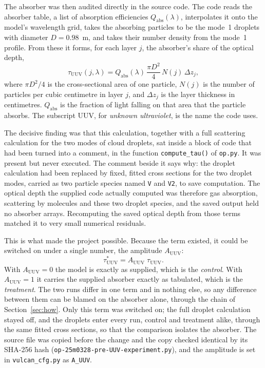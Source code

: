 The absorber was then audited directly in the source code. The code reads the absorber
table, a list of absorption efficiencies $Q_{\mathrm{abs}}(\lambda)$, interpolates it onto
the model's wavelength grid, takes the absorbing particles to be the mode~1 droplets with
diameter $D = 0.98$~\textmu m, and takes their number density from the mode~1 profile.
From these it forms, for each layer $j$, the absorber's share of the optical depth,
\begin{equation}
  \tau_{\mathrm{UUV}}(j,\lambda)
    = Q_{\mathrm{abs}}(\lambda)\,\frac{\pi D^{2}}{4}\,N(j)\,\Delta z_j ,
  \label{eq:tauuuv}
\end{equation}
where $\pi D^{2}/4$ is the cross-sectional area of one particle, $N(j)$ is the number of
particles per cubic centimetre in layer $j$, and $\Delta z_j$ is the layer thickness in
centimetres. $Q_{\mathrm{abs}}$ is the fraction of light falling on that area that the
particle absorbs. The subscript UUV, for \emph{unknown ultraviolet}, is the name the code
uses.

The decisive finding was that this calculation, together with a full scattering
calculation for the two modes of cloud droplets, sat inside a block of code that had been
turned into a comment, in the function \texttt{compute\_tau()} of \texttt{op.py}. It was
present but never executed. The comment beside it says why: the droplet calculation had
been replaced by fixed, fitted cross sections for the two droplet modes, carried as two
particle species named \texttt{V} and \texttt{V2}, to save computation. The optical depth
the supplied code actually computed was therefore gas absorption, scattering by
molecules and these two droplet species, and the saved output held no absorber arrays.
Recomputing the saved optical depth from those terms matched it to very small numerical
residuals.

This is what made the project possible. Because the term existed, it could be switched on
under a single number, the amplitude $A_{\mathrm{UUV}}$:
\begin{equation}
  \tau^{*}_{\mathrm{UUV}} = A_{\mathrm{UUV}}\;\tau_{\mathrm{UUV}} .
  \label{eq:amp}
\end{equation}
With $A_{\mathrm{UUV}} = 0$ the model is exactly as supplied, which is the
\emph{control}. With $A_{\mathrm{UUV}} = 1$ it carries the supplied absorber exactly as
tabulated, which is the \emph{treatment}. The two runs differ in one term and in nothing
else, so any difference between them can be blamed on the absorber alone, through the
chain of Section~\ref{sec:how}. Only this term was switched on; the full droplet calculation
stayed off, and the droplets enter every run, control and treatment alike, through the
same fitted cross sections, so that the comparison isolates the absorber. The source file was
copied before the change and the copy checked identical by its SHA-256 hash (\texttt{op-25m0328-pre-UUV-experiment.py}),
and the amplitude is set in \texttt{vulcan\_cfg.py} as \texttt{A\_UUV}.

